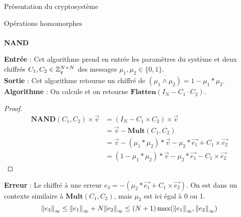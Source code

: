 \begin{section}{Présentation du cryptosystème}
\begin{subsection}{Opérations homomorphes}
	\paragraph{}
	\textbf{NAND}
	\flushleft
	
	\textbf{Entrée} : Cet algorithme prend en entrée les paramètres du système et deux chiffrés $C_1, C_2 \in \mathbb{Z}_q^{N \times N}$ des messages $\mu_1, \mu_2 \in \{ 0,1\}$.\\
	\textbf{Sortie} : Cet algorithme retourne un chiffré de $\overline{(\mu_1 \land \mu_2)} = 1 - \mu_1 * \mu_2$. \\
	\textbf{Algorithme} : On calcule et on retourne $\textbf{Flatten}(I_N - C_1 \cdot C_2)$.
	\begin{proof}
	\begin{align*}
	\textbf{NAND}(C_1, C_2) \times \vec{v} &= (I_N - C_1 \times C_2) \times \vec{v} \\
	&= \vec{v} - \textbf{Mult}(C_1, C_2) \\
	&= \vec{v} - (\mu_1 * \mu_2) * \vec{v} - \mu_2 * \vec{e_1} + C_1 \times \vec{e_2} \\
	&= (1 - \mu_1 * \mu_2) * \vec{v} - \mu_2 * \vec{e_1} - C_1 \times \vec{e_2}
	\end{align*}
	\end{proof}
	\textbf{Erreur} : Le chiffré à une erreur 
	$e_3 = -(\mu_2 * \vec{e_1} + C_1 \times \vec{e_2})$. On est dans 
	un contexte similaire à $\textbf{Mult}(C_1, C_2)$, mais 
	$\mu_2$ est ici égal à 0 ou 1.
\[{\|e_3\|}_{\infty} \leq {\|e_1\|}_{\infty} + N {\|e_2\|}_{\infty} \leq (N+1) \max({\|e_1\|}_{\infty}, {\|e_2\|}_{\infty})\]
	\end{subsection}
\end{section}
